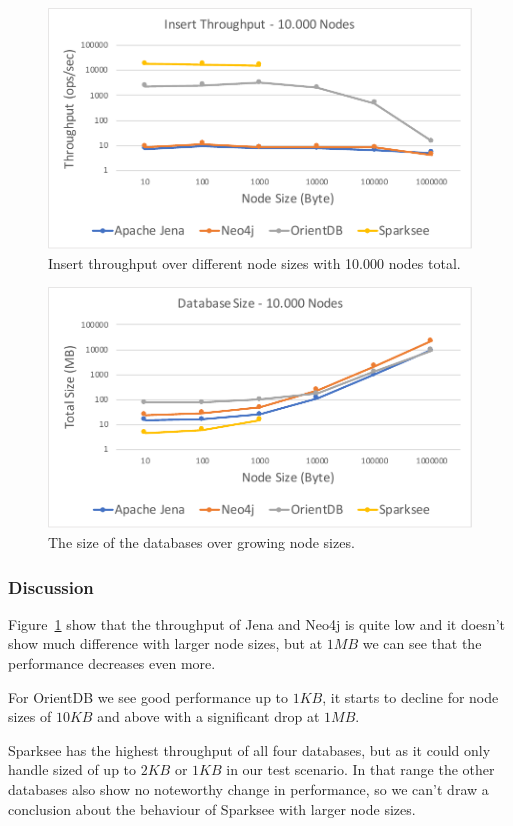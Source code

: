 \begin{figure}[h!]
  \centering
  \includegraphics[width=.75\textwidth]{images/throughput/nodeSize}
  \caption{Insert throughput over different node sizes with 10.000 nodes total.}
  \label{fig:nodeSize}
\end{figure}

\begin{figure}[h!]
  \centering
  \includegraphics[width=.75\textwidth]{images/throughput/sizeDatabaseSize}
  \caption{The size of the databases over growing node sizes.}
  \label{fig:sizeDatabaseSize}
\end{figure}

\subsubsection{Discussion}
Figure~\ref{fig:nodeSize} show that the throughput of Jena and Neo4j is quite low and it doesn't show much difference with larger node sizes,
but at $ 1MB $ we can see that the performance decreases even more.

For OrientDB we see good performance up to $ 1KB $,
it starts to decline for node sizes of $ 10KB $ and above with a significant drop at $ 1MB $.

Sparksee has the highest throughput of all four databases,
but as it could only handle sized of up to $ 2KB $ or $ 1KB $ in our test scenario.
In that range the other databases also show no noteworthy change in performance,
so we can't draw a conclusion about the behaviour of Sparksee with larger node sizes.

